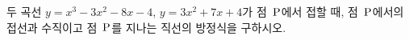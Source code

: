 두 곡선 $y=x^3-3x^2-8x-4$, $y=3x^2+7x+4$가 점~$\mathrm{P}$에서 접할 때, 점~$\mathrm{P}$에서의 접선과 수직이고 점~$\mathrm{P}$를 지나는 직선의 방정식을 구하시오.
